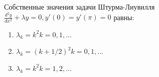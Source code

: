 Собственные значения задачи Штурма-Лиувилля  \(\frac{d^2y}{dx^2}+\lambda y =0, y'\left(0\right)=y'\left(\pi \right) =0\) равны:

\begin{enumerate}[label=\arabic*)]
    \item \(\lambda _k=k^2 k=0,1,\dots\)
    \item \(\lambda _k=(k+1/2)^2 k=0,1,\dots\)
    \item \(\lambda _k=k^2 k=1,2,\dots\)
\end{enumerate}

